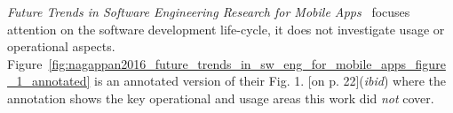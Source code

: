 \emph{Future Trends in Software Engineering Research for Mobile Apps}~ focuses attention on the software development life-cycle, it does not investigate usage or operational aspects. Figure~\ref{fig:nagappan2016_future_trends_in_sw_eng_for_mobile_apps_figure_1_annotated} is an annotated version of their Fig. 1. [on p. 22](\textit{ibid}) where the annotation shows the key operational and usage areas this work did \emph{not} cover. 

